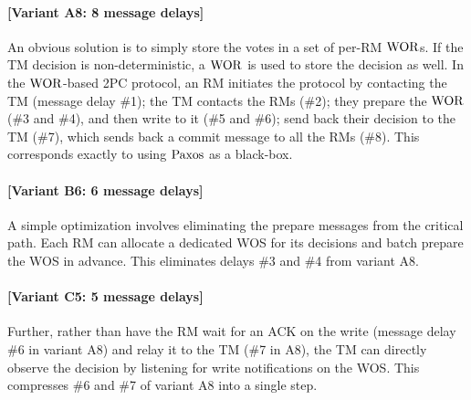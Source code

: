\paragraph{[Variant A8: 8 message delays]} An obvious solution is to simply store the votes in a set of per-RM $\mathrm{WOR}$s. 
If the TM decision is non-deterministic, a $\mathrm{WOR}$ is used to store the decision as well. In the $\mathrm{WOR}$-based 2PC protocol, 
an RM initiates the protocol by contacting the TM (message delay \#1); the TM contacts the RMs (\#2); 
they prepare the $\mathrm{WOR}$ (\#3 and \#4), and then write to it (\#5 and \#6); send back their decision to the TM (\#7), 
which sends back a commit message to all the RMs (\#8). This corresponds exactly to using $\mathrm{Paxos}$ as a black-box.


\paragraph{[Variant B6: 6 message delays]} A simple optimization involves eliminating the prepare messages from the critical path. 
Each RM can allocate a dedicated WOS for its decisions and batch prepare the WOS in advance. 
This eliminates delays \#3 and \#4 from variant A8.%


\paragraph{[Variant C5: 5 message delays]} Further, rather than have the RM wait for an ACK on the write (message delay \#6 in variant A8) and 
relay it to the TM (\#7 in A8), the TM can directly observe the decision by listening for write notifications on the WOS. 
This compresses \#6 and \#7 of variant A8 into a single step.


